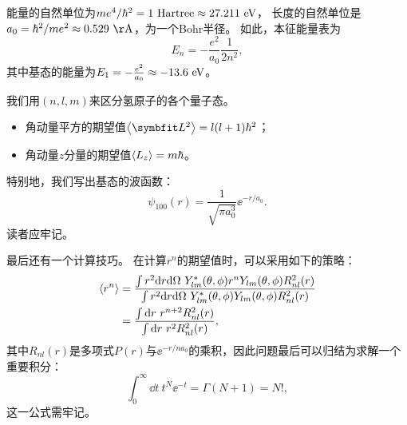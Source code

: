 能量的自然单位为$me^4/\hbar^2 = 1\ \rm{Hartree} \approx 27.211\ \rm{eV}$，
长度的自然单位是$a_0 = \hbar^2/me^2 \approx 0.529\ \rm{Å}$，为一个Bohr半径。
如此，本征能量表为
\begin{equation}
    E_n = -\frac{e^2}{a_0}\frac{1}{2n^2},
\end{equation}
其中基态的能量为$E_1 = -\frac{e^2}{a_0} \approx -13.6\ \rm{eV}$。

我们用$(n,l,m)$来区分氢原子的各个量子态。
\begin{itemize}
    \item 角动量平方的期望值$\expval{\LL^2}=l(l+1)\hbar^2$；
    \item 角动量$z$分量的期望值$\expval{L_z}=m\hbar$。
\end{itemize}

特别地，我们写出基态的波函数：
\begin{equation}
    \psi_{100}(r) = \frac{1}{\sqrt{\pi a_0^3}}\ee^{-r/a_0}.
\end{equation}
读者应牢记。

最后还有一个计算技巧。
在计算$r^n$的期望值时，可以采用如下的策略：
\begin{equation}
\begin{aligned}
    \expval{r^n}
    &= \frac{\int r^2 \dd r \dd\Omega \ Y_{lm}^*(\theta,\phi) r^n Y_{lm}(\theta,\phi) R_{nl}^2(r)}{\int r^2 \dd r \dd\Omega \ Y_{lm}^*(\theta,\phi) Y_{lm}(\theta,\phi) R_{nl}^2(r)} \\
    &= \frac{\int\dd r \ r^{n+2} R_{nl}^2(r)}{\int\dd r \ r^2 R_{nl}^2(r)},
\end{aligned}
\end{equation}
其中$R_{nl}(r)$是多项式$P(r)$与$\ee^{-r/na_0}$的乘积，因此问题最后可以归结为求解一个重要积分：
\begin{equation}
    \int_0^\infty \dd t \ t^{N} \ee^{-t} = \Gamma(N+1) = N!,
\end{equation}
这一公式需牢记。
